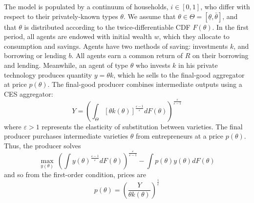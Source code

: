 \documentclass[11pt]{article}
\begin{document}
The model is populated by a continuum of households, \( i\in[0,1] \), who differ with respect to their privately-known types \( \theta \). We assume that \( \theta\in\Theta=\left[ \underline{\theta}, \bar{\theta} \right] \), and that \( \theta \) is distributed according to the twice-differentiable CDF \( F(\theta) \). In the first period, all agents are endowed with initial wealth \( w \), which they allocate to consumption and savings. Agents have two methods of saving: investments \( k \), and borrowing or lending \( b \). All agents earn a common return of \( R \) on their borrowing and lending. Meanwhile, an agent of type \( \theta \) who invests \( k \) in his private technology produces quantity \( y = \theta k \), which he sells to the final-good aggregator at price \( p(\theta) \). The final-good producer combines intermediate outputs using a CES aggregator:
\begin{equation}
    Y = \left(\int_{\Theta}\left[\theta k\left(\theta\right)\right]^{\frac{\varepsilon-1}{\varepsilon}}dF\left(\theta\right)\right)^{\frac{\varepsilon}{\varepsilon-1}}
\end{equation}
where \( \varepsilon>1 \) represents the elasticity of substitution between varieties. The final producer purchases intermediate varieties \( \theta \) from entrepreneurs at a price \( p(\theta) \). Thus, the producer solves 
\begin{equation}
    \max_{y\left(\theta\right)}\ \left(\int y\left(\theta\right)^{\frac{\varepsilon-1}{\varepsilon}}dF\left(\theta\right)\right)^{\frac{\varepsilon}{\varepsilon-1}}-\int p\left(\theta\right)y\left(\theta\right)dF\left(\theta\right) 
\end{equation}
and so from the first-order condition, prices are 
\begin{equation}
    p(\theta) = \left(\frac{Y}{\theta k\left(\theta\right)}\right)^{\frac{1}{\varepsilon}} \label{eq:static_ptheta}
\end{equation}
\end{document}
